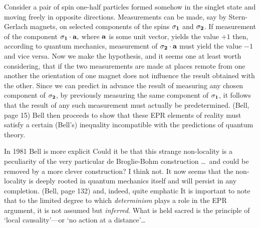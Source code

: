 \bq \noindent Consider a pair of spin one-half particles formed somehow in
the singlet state and moving freely in opposite directions. Measurements
can be made, say by Stern-Gerlach magnets, on selected components of the
spins $\bf\sigma_1$ and   $\bf\sigma_2$. If measurement of the component
$\bf\sigma_1\cdot\bf a,$ where $\bf a$ is some unit vector, yields the value
$+1$ then, according to quantum mechanics,  measurement of
$\bf\sigma_2\cdot\bf a$ must yield the value $-1$ and vice versa. Now we make
the hypothesis, and it seems one at least worth considering, that if the
two  measurements are made at places remote from one another the orientation
of one magnet does not influence the result obtained with the other. Since
we can predict in advance the result of measuring any chosen component of
$\bf\sigma_2$, by previously measuring the same component of $\bf\sigma_1$, it
follows that the result of any such measurement must actually be
predetermined. (Bell, page 15)
\eq
Bell then proceeds to show that these EPR elements of reality must satisfy
a certain (Bell's) inequality incompatible with the predictions of quantum
theory.

In 1981 Bell is more explicit
\bq
Could it be that this strange non-locality is a peculiarity of the very
particular de Broglie-Bohm construction \dots\  and could be removed by a more
clever construction? I think not. It now seems that the  non-locality is
deeply rooted in quantum mechanics itself and will persist in any
completion. (Bell, page 132)
\eq
and, indeed, quite emphatic
\bq It is important to note that to the limited degree to which {\it
determinism\/} plays a role in the EPR argument, it is not assumed but
{\it inferred\/}. What is held sacred is the principle of `local
causality'---or `no action at a distance'\dots

